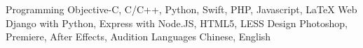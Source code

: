 \begin{cvskills}
  \cvskill
    {Programming}
    {Objective-C, C/C++, Python, Swift, PHP, Javascript, LaTeX}
  \cvskill
    {Web}
    {Django with Python, Express with Node.JS, HTML5, LESS}
  \cvskill
  	{Design}
	{Photoshop, Premiere, After Effects, Audition}
  \cvskill
    {Languages}
    {Chinese, English}
\end{cvskills}
